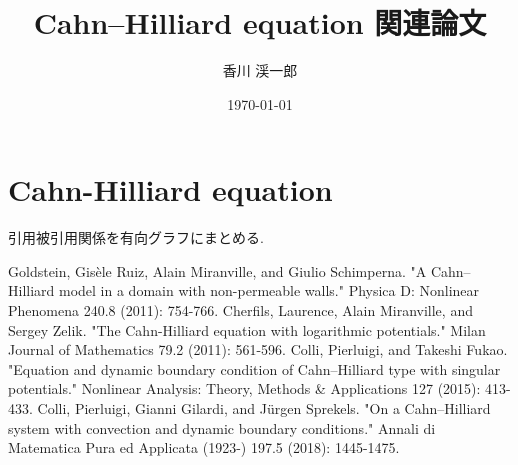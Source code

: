 \documentclass[openary, a4paper, oneside]{jsarticle}
\author{香川 渓一郎}
\date{\today}
\title{Cahn--Hilliard equation 関連論文}
\begin{document}
\maketitle
\tableofcontents

\section{Cahn-Hilliard equation}
引用被引用関係を有向グラフにまとめる.


\begin{thebibliography}{99}
	Goldstein, Gis\`ele Ruiz, Alain Miranville, and Giulio Schimperna. "A Cahn–Hilliard model in a domain with non-permeable walls." Physica D: Nonlinear Phenomena 240.8 (2011): 754-766.
	Cherfils, Laurence, Alain Miranville, and Sergey Zelik. "The Cahn-Hilliard equation with logarithmic potentials." Milan Journal of Mathematics 79.2 (2011): 561-596.
	Colli, Pierluigi, and Takeshi Fukao. "Equation and dynamic boundary condition of Cahn--Hilliard type with singular potentials." Nonlinear Analysis: Theory, Methods \& Applications 127 (2015): 413-433.
	Colli, Pierluigi, Gianni Gilardi, and J\"urgen Sprekels. "On a Cahn–Hilliard system with convection and dynamic boundary conditions." Annali di Matematica Pura ed Applicata (1923-) 197.5 (2018): 1445-1475.
\end{thebibliography}
\end{document}
